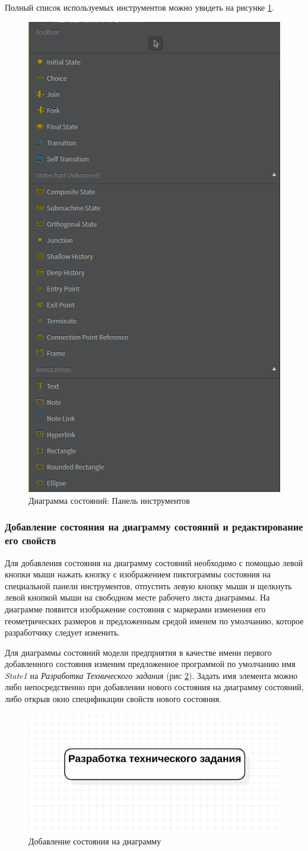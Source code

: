 \documentclass[a4paper,12pt]{extreport}
\begin{document}
Полный список используемых инструментов можно увидеть на рисунке \ref{fig:statecharttoolbox}.
\begin{figure}[h!]
	\centering
	\includegraphics[width=0.3\linewidth]{images/statecharttoolbox}
	\caption{Диаграмма состояний: Панель инструментов}
	\label{fig:statecharttoolbox}
\end{figure}
\subsubsection*{Добавление состояния на диаграмму состояний и редактирование его свойств}
Для добавления состояния на диаграмму состояний необходимо с помощью левой кнопки мыши нажать кнопку с изображением пиктограммы состояния на специальной панели инструментов, отпустить левую кнопку мыши и щелкнуть левой кнопкой мыши на свободном месте рабочего листа диаграммы. На диаграмме появится изображение состояния с маркерами изменения его геометрических размеров и предложенным средой именем по умолчанию, которое разработчику следует изменить.

 Для диаграммы состояний модели предприятия в качестве имени первого добавленного состояния изменим предложенное программой по умолчанию имя \textit{State1} на \textit{Разработка Технического задания} (рис \ref{fig:statechartinit}). Задать имя элемента можно либо непосредственно при добавлении нового состояния на диаграмму состояний, либо открыв окно спецификации свойств нового состояния.

\begin{figure}[h!]
	\centering
	\includegraphics[width=0.5\linewidth]{images/statechartinit}
	\caption{Добавление состояния на диаграмму}
	\label{fig:statechartinit}
\end{figure}
\end{document}
